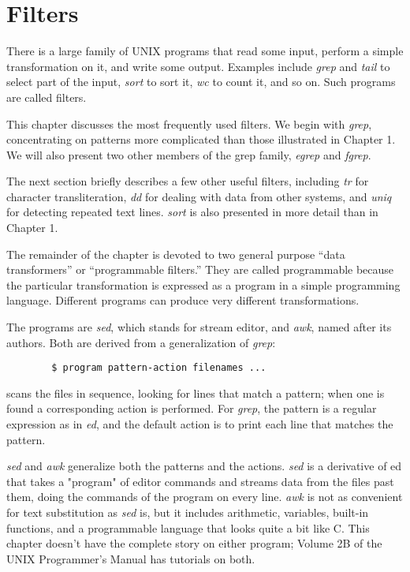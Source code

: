 \chapter{Filters}

There is a large family of UNIX programs that read some input, perform a simple
transformation on it, and write some output. Examples include \textit{grep} and
\textit{tail} to select part of the input, \textit{sort} to sort it, \textit{wc}
to count it, and so on. Such programs are called filters.

This chapter discusses the most frequently used filters. We begin with
\textit{grep}, concentrating on patterns more complicated than those illustrated
in Chapter 1. We will also present two other members of the grep family,
\textit{egrep} and \textit{fgrep}.

The next section briefly describes a few other useful filters, including
\textit{tr} for character transliteration, \textit{dd} for dealing with data
from other systems, and \textit{uniq} for detecting repeated text
lines. \textit{sort} is also presented in more detail than in Chapter 1.

The remainder of the chapter is devoted to two general purpose ``data
transformers'' or ``programmable filters.'' They are called programmable because
the particular transformation is expressed as a program in a simple programming
language. Different programs can produce very different transformations.

The programs are \textit{sed}, which stands for stream editor, and \textit{awk},
named after its authors. Both are derived from a generalization of
\textit{grep}:
\begin{verbatim}
        $ program pattern-action filenames ...
\end{verbatim}
scans the files in sequence, looking for lines that match a pattern; when one is
found a corresponding action is performed. For \textit{grep}, the pattern is a
regular expression as in \textit{ed}, and the default action is to print each
line that matches the pattern.

\textit{sed} and \textit{awk} generalize both the patterns and the
actions. \textit{sed} is a derivative of ed that takes a "program" of editor
commands and streams data from the files past them, doing the commands of the
program on every line. \textit{awk} is not as convenient for text substitution
as \textit{sed} is, but it includes arithmetic, variables, built-in functions,
and a programmable language that looks quite a bit like C. This chapter doesn't
have the complete story on either program; Volume 2B of the UNIX Programmer's
Manual has tutorials on both.

